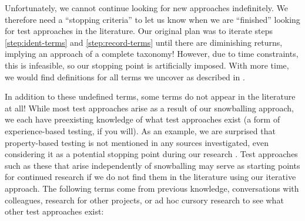 Unfortunately, we cannot continue looking for new approaches indefinitely. We
therefore need a ``stopping criteria'' to let us know when we are ``finished''
looking for test approaches in the literature. Our original plan was to iterate
steps \ref{step:ident-terms} and \ref{step:record-terms} until there are
diminishing returns, implying an approach of a complete taxonomy! However, due
to time constraints, this is infeasible, so our stopping point is artificially
imposed. With more time, we would find definitions for all terms we uncover as
described in .

\ifnotpaper
    In addition to these undefined terms, some terms do not appear in
    the literature at all! While most test approaches arise as a result of our
    snowballing approach, we each have preexisting knowledge of what test
    approaches exist (a form of experience-based testing, if you will).
    As an example, we are surprised that property-based testing is not mentioned
    in any sources investigated, even considering it as a potential stopping point
    during our research%
    . Test approaches such as these that arise independently of snowballing
    may serve as starting points for continued research if we do not find
    them in the literature using our iterative approach. The following terms come
    from previous knowledge, conversations with colleagues, research for other
    projects, or ad hoc cursory research to see what other test approaches exist:
    \newline

